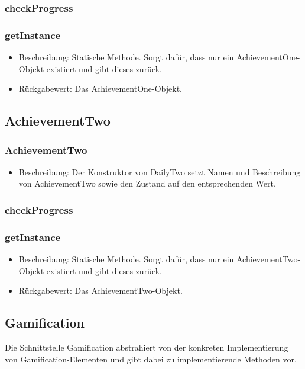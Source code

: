 \documentclass[a4paper]{scrreprt}
\begin{document}
   \subsubsection{checkProgress}
   \subsubsection{getInstance}
   \begin{itemize}
   \item Beschreibung: Statische Methode. Sorgt dafür, dass nur ein AchievementOne-Objekt existiert und gibt dieses zurück.
   \item Rückgabewert: Das AchievementOne-Objekt.
\end{itemize}
   
   \subsection{AchievementTwo}
   \subsubsection{AchievementTwo}
   \begin{itemize}
   	\item Beschreibung: Der Konstruktor von DailyTwo setzt Namen und Beschreibung von AchievementTwo sowie den Zustand auf den entsprechenden Wert.
   \end{itemize}
   \subsubsection{checkProgress}
   \subsubsection{getInstance}
   \begin{itemize}
   \item Beschreibung: Statische Methode. Sorgt dafür, dass nur ein AchievementTwo-Objekt existiert und gibt dieses zurück.
   \item Rückgabewert: Das AchievementTwo-Objekt.
\end{itemize}
   
      
   \subsection{Gamification}
   Die Schnittstelle Gamification abstrahiert von der konkreten Implementierung von Gamification-Elementen und gibt dabei zu implementierende Methoden vor.
\end{document}
